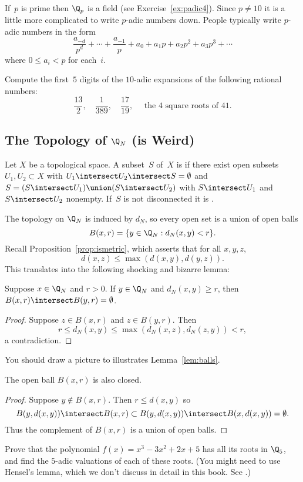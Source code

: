 \documentclass[11pt]{book}
\begin{document}
\begin{ch}
If~$p$ is prime then $\Q_p$ is a field (see Exercise~\ref{ex:padic4}).
Since $p\neq 10$ it is a little more
complicated to write $p$-adic numbers down.  People typically write
$p$-adic numbers in the form
$$
  \frac{a_{-\!d}}{p^{d}} + \cdots + \frac{a_{-1}}{p} + a_0 + a_1 p + a_2 p^2 + a_3 p^3 + \cdots
$$
where $0\leq a_i < p$ for each~$i$.

\begin{exercise} \label{ex:topology7}
Compute the first~$5$ digits of the $10$-adic expansions of the following
rational numbers:
$$
 \frac{13}{2}, \quad \frac{1}{389}, \quad \frac{17}{19},
 \quad \text{ the 4 square roots of $41$}.
$$
\end{exercise}




\subsection{The Topology of $\Q_N$ (is Weird)}\label{sec:qnweird}
\begin{definition}[Connected]\label{def:connected}
Let $X$ be a topological space.  A subset~$S$ of~$X$ is
if there exist open subsets $U_1, U_2\subset X$ with $U_1\intersect U_2\intersect S=\emptyset$
and $S=(S\intersect U_1)\union (S\intersect U_2)$ with
$S\intersect U_1$ and $S\intersect U_2$ nonempty.
If~$S$ is not disconnected it is .
\end{definition}

The topology on $\Q_N$ is induced by $d_N$, so every open set is a union
of open balls
$$
  B(x,r) = \{y \in \Q_N : d_N(x,y) < r\}.
$$
Recall Proposition~\ref{prop:ismetric}, which asserts that for
all $x,y,z$,
$$
 d(x,z) \leq \max(d(x,y), d(y,z)).
$$
This translates into the following shocking and bizarre lemma:
\begin{lemma}\label{lem:balls}
Suppose $x\in \Q_N$ and $r>0$.  If $y\in\Q_N$ and $d_N(x,y)\geq r$, then
$B(x,r)\intersect B(y,r) = \emptyset$.
\end{lemma}
\begin{proof}
Suppose $z\in B(x,r)$ and $z\in B(y,r)$.  Then
$$
 r\leq d_N(x,y) \leq \max(d_N(x,z), d_N(z,y)) < r,
$$
a contradiction.
\end{proof}
You should draw a picture to illustrates Lemma~\ref{lem:balls}.
\begin{lemma}\label{lem:opencomplement}
The open ball $B(x,r)$ is also closed.
\end{lemma}
\begin{proof}
Suppose $y\not\in B(x,r)$.  Then $r\leq d(x,y)$ so
$$
 B(y,d(x,y)) \intersect B(x,r)
\subset
 B(y,d(x,y)) \intersect B(x,d(x,y))
 = \emptyset.
$$
Thus the complement of $B(x,r)$ is a union of open balls.
\end{proof}
\begin{exercise}\label{ex:topology8}
Prove that the polynomial $f(x)=x^3 - 3x^2 + 2x + 5$
has all its roots in $\Q_5$, and find the $5$-adic valuations
of each of these roots.  (You might need to use
Hensel's lemma, which we don't discuss in detail
in this book. See \cite[App.~C]{cassels:global}.)
\end{exercise}


\end{ch}
\end{document}

